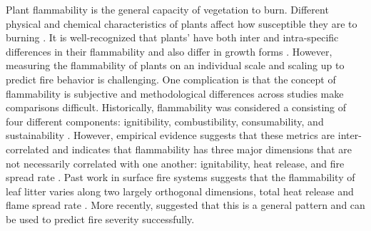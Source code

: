 \documentclass[12pt]{report}
\begin{document}
Plant flammability is the general capacity of vegetation to burn. Different physical and chemical characteristics of plants affect how susceptible they are to burning \citep{bond1996fire}. It is well-recognized that plants' have both inter and intra-specific differences in their flammability \citep{pausas2012fire, battersby2017exploring, cui2020shoot, cui2022intraspecific} and also differ in growth forms \citep{calitz2015investigating, jaureguiberry2011device, zanzarini2022flammability, potts2022growth, cui2020shoot, wyse2016quantitative}. However, measuring the flammability of plants on an individual scale and scaling up to predict fire behavior is challenging. One complication is that the concept of flammability is subjective \citep{gill2005flammability} and methodological differences across studies make comparisons difficult. Historically, flammability was considered a consisting of four different components: ignitibility, combustibility, consumability, and sustainability \citep{anderson1970forest, martin1993assessing}. However, empirical evidence suggests that these metrics are inter-correlated and indicates that flammability has three major dimensions that are not necessarily correlated with one another: ignitability, heat release, and fire spread rate \citep{pausas2017flammability}. Past work in surface fire systems suggests that the flammability of leaf litter varies along two largely orthogonal dimensions, total heat release and flame spread rate \citep{de2012leaf}. More recently, \citep{prior2018conceptualizing} suggested that this is a general pattern and can be used to predict fire severity successfully. \\
\end{document}
